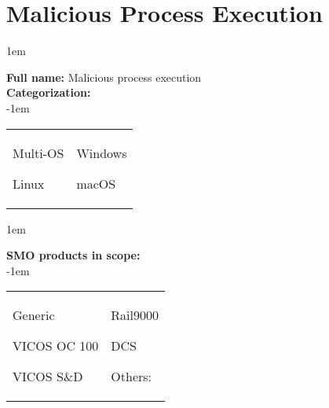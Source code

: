
%
%

\section{Malicious Process Execution}
\label{15060}

\openup 1em

\textbf{Full name:} Malicious process execution\hrulefill \\
{\bf Categorization:} \\

\openup -1em
\vspace{-3em}

\begin{tabular}{p{}p{}}

\begin{todolist}
  	\item Multi-OS
	\item Linux
\end{todolist}
&
\begin{todolist}
	\item[\done] Windows
	\item macOS
\end{todolist}

\end{tabular}

\openup 1em

{\bf SMO products in scope:} \\

\openup -1em
\vspace{-3em}

\begin{tabular}{p{}p{}}

\begin{todolist}
  \item[\done] Generic
  \item[\done] VICOS OC 100
  \item[\done] VICOS S\&D
\end{todolist}
&
\begin{todolist}
  \item Rail9000
  \item DCS
  \item Others: \hrulefill
\end{todolist}

\end{tabular}

